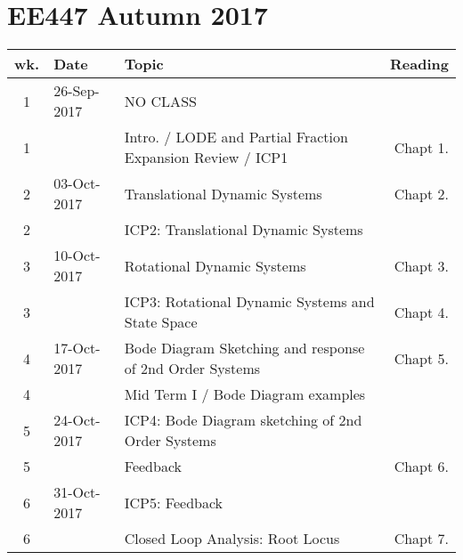 

\section*{ EE447 Autumn 2017}

\begin{tabular}{|c|l|l|r|} 
 \hline
 wk.  & Date &Topic  & Reading \\ \hline 
1 &                                                               26-Sep-2017
&  NO CLASS &  \\ \hline 
1 &                                                               
&  Intro. / LODE and Partial Fraction Expansion Review / ICP1      	 &   Chapt 1. \\ \hline 


2 &                                                               03-Oct-2017
&  Translational Dynamic Systems				 &   Chapt 2. \\ \hline 
2 &                                                               
&  ICP2: Translational Dynamic Systems  &  \\ \hline 


3 &                                                               10-Oct-2017
&  Rotational Dynamic Systems 					 &  Chapt 3. \\ \hline 
3 &                                                               
&  ICP3: Rotational Dynamic Systems and State Space                  &  Chapt 4. \\ \hline 


4 &                                                               17-Oct-2017
&  Bode Diagram Sketching and response of 2nd Order Systems	  &  Chapt 5. \\ \hline 
4 &                                                               
&  Mid Term I  /  Bode Diagram examples &  \\ \hline 


5 &                                                               24-Oct-2017
&  ICP4: Bode Diagram sketching of 2nd Order Systems &  \\ \hline 
5 &                                                               
&  Feedback							 &  Chapt 6. \\ \hline 


6 &                                                               31-Oct-2017
&  ICP5: Feedback &  \\ \hline 
6 &                                                               
&  Closed Loop Analysis:  Root Locus					 &  Chapt 7. \\ \hline 



\end{tabular}
